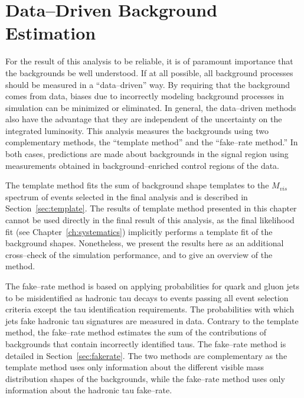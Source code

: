 \ifx\master\undefined\fi
\newcommand{\tablesize}{\small} \chapter{Data--Driven Background Estimation}
\label{ch:backgrounds}
%
For the result of this analysis to be reliable, it is of paramount importance
that the backgrounds be well understood.  If at all possible, all background
processes should be measured in a ``data--driven'' way.  By requiring that the
background comes from data, biases due to incorrectly modeling background
processes in simulation can be minimized or eliminated.  In general, the
data--driven methods also have the advantage that they are independent of the
uncertainty on the integrated luminosity.  This analysis measures the
backgrounds using two complementary methods, the ``template method'' and the
``fake--rate method.'' In both cases, predictions are made about backgrounds in
the signal region using measurements obtained in background--enriched control
regions of the data. 

The template method fits the sum of background shape templates  to the $M_{vis}$
spectrum of events selected in the final analysis and is described in
Section~\ref{sec:template}.  The results of template method presented in this
chapter cannot be used directly in the final result of this analysis, as the
final likelihood fit (see Chapter~\ref{ch:systematics}) implicitly performs a
template fit of the background shapes.  Nonetheless, we present the results here
as an additional cross--check of the simulation performance, and to give an
overview of the method.

The fake--rate method is based on applying probabilities for quark and gluon
jets to be misidentified as hadronic tau decays to events passing all event
selection criteria except the tau identification requirements.  The
probabilities with which jets fake hadronic tau signatures are measured in data.
Contrary to the template method, the fake--rate method estimates the sum of the
contributions of backgrounds that contain incorrectly identified taus.  The
fake--rate method is detailed in Section~\ref{sec:fakerate}.  The two methods
are complementary as the template method uses only information about the
different visible mass distribution shapes of the backgrounds, while the
fake--rate method uses only information about the hadronic tau fake--rate.

